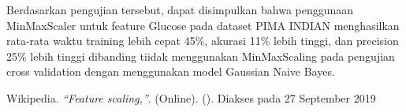 \documentclass[conference]{IEEEtran}
\begin{document}
Berdasarkan pengujian tersebut, dapat disimpulkan bahwa penggunaan MinMaxScaler untuk feature Glucose pada dataset PIMA INDIAN menghasilkan rata-rata waktu training lebih cepat 45\%, akurasi 11\% lebih tinggi, dan precision 25\% lebih tinggi dibanding tiidak menggunakan MinMaxScaling pada pengujian cross validation dengan menggunakan model Gaussian Naive Bayes.

\begin{thebibliography}{00}
 Wikipedia. \textit{``Feature scaling,''}. (Online). (). Diakses pada 27 September 2019
\end{thebibliography}
\end{document}

